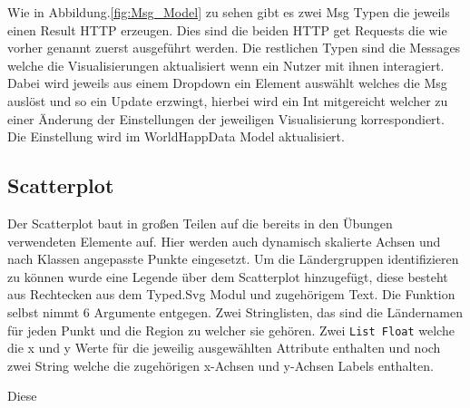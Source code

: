 Wie in  Abbildung.\ref{fig:Msg_Model} zu sehen gibt es zwei Msg Typen die jeweils einen Result HTTP erzeugen. Dies sind die beiden HTTP get Requests die wie vorher genannt zuerst ausgeführt werden. Die restlichen Typen sind die Messages welche die Visualisierungen aktualisiert wenn ein Nutzer mit ihnen interagiert. Dabei wird jeweils aus einem Dropdown ein Element auswählt welches die Msg auslöst und so ein Update erzwingt, hierbei wird ein Int mitgereicht welcher zu einer Änderung der Einstellungen der jeweiligen Visualisierung korrespondiert. Die Einstellung wird im WorldHappData Model aktualisiert.
\newpage
\subsection{Scatterplot}

Der Scatterplot baut in großen Teilen auf die bereits in den Übungen verwendeten Elemente auf. Hier werden auch dynamisch skalierte Achsen und nach Klassen angepasste Punkte eingesetzt. Um die Ländergruppen identifizieren zu können wurde eine Legende über dem Scatterplot hinzugefügt, diese besteht aus Rechtecken aus dem Typed.Svg Modul und zugehörigem Text. Die Funktion selbst nimmt 6 Argumente entgegen. Zwei Stringlisten, das sind die Ländernamen für jeden Punkt und die Region zu welcher sie gehören. Zwei \texttt{List Float} welche die x und y Werte für die jeweilig ausgewählten Attribute enthalten und noch zwei String welche die zugehörigen x-Achsen und y-Achsen Labels enthalten. 

Diese 